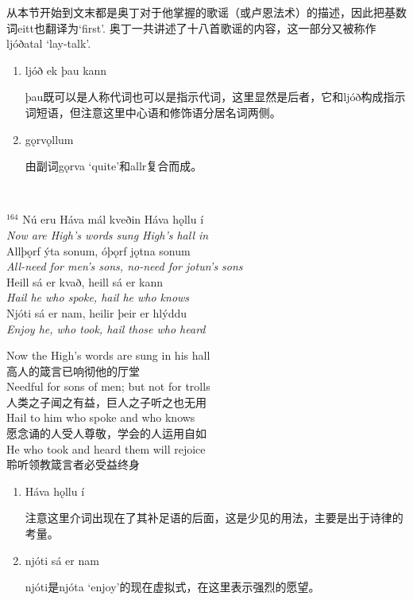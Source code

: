 \begin{grammar*}{}
    从本节开始到文末都是奥丁对于他掌握的歌谣（或卢恩法术）的描述，因此把基数词eitt也翻译为`first'. 奥丁一共讲述了十八首歌谣的内容，这一部分又被称作ljóðatal `lay-talk'.
    \begin{enumerate}[leftmargin=*]
        \item ljóð ek þau kann

              þau既可以是人称代词也可以是指示代词，这里显然是后者，它和ljóð构成指示词短语，但注意这里中心语和修饰语分居名词两侧。

        \item gǫrvǫllum

              由副词gǫrva `quite'和allr复合而成。
    \end{enumerate}
\end{grammar*}
\hspace*{\fill}\\ %
\begin{paracol}{2}
    \noindent
    $^{164}$ Nú eru Háva mál kveðin Háva hǫllu í\\
    \textit{Now are High's words sung High's hall in}\\
    Allþǫrf ýta sonum, óþǫrf jǫtna sonum\\
    \textit{All-need for men's sons, no-need for jotun's sons}\\
    Heill sá er kvað, heill sá er kann\\
    \textit{Hail he who spoke, hail he who knows}\\
    Njóti sá er nam, heilir þeir er hlýddu\\
    \textit{Enjoy he, who took, hail those who heard }\\
    \switchcolumn

    \noindent
    Now the High's words are sung in his hall\\
    高人的箴言已响彻他的厅堂\\
    Needful for sons of men; but not for trolls\\
    人类之子闻之有益，巨人之子听之也无用\\
    Hail to him who spoke and who knows\\
    愿念诵的人受人尊敬，学会的人运用自如\\
    He who took and heard them will rejoice\\
    聆听领教箴言者必受益终身\\

\end{paracol}

\begin{grammar*}{}
    \begin{enumerate}[leftmargin=*]
        \item Háva hǫllu í

              注意这里介词出现在了其补足语的后面，这是少见的用法，主要是出于诗律的考量。

        \item njóti sá er nam

              njóti是njóta `enjoy'的现在虚拟式，在这里表示强烈的愿望。

    \end{enumerate}
\end{grammar*}
\hspace*{\fill}\\ %